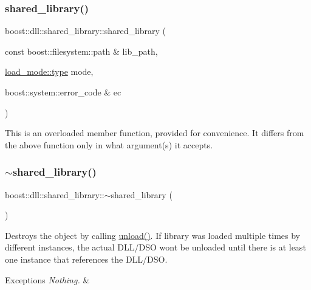\subsubsection{\texorpdfstring{shared\+\_\+library()}{shared\_library()}\hspace{0.1cm}{\footnotesize\ttfamily [7/7]}}
{\footnotesize\ttfamily boost\+::dll\+::shared\+\_\+library\+::shared\+\_\+library (\begin{DoxyParamCaption}\item[{const boost\+::filesystem\+::path \&}]{lib\+\_\+path,  }\item[{\hyperlink{a00272_a1918a602801479bc0bade54ff5665129}{load\+\_\+mode\+::type}}]{mode,  }\item[{boost\+::system\+::error\+\_\+code \&}]{ec }\end{DoxyParamCaption})\hspace{0.3cm}{\ttfamily [inline]}}

This is an overloaded member function, provided for convenience. It differs from the above function only in what argument(s) it accepts. \mbox{\label{a01708_aa8df68945bd8598c3b873f622d6d2baa}} 
\subsubsection{\texorpdfstring{$\sim$shared\+\_\+library()}{~shared\_library()}}
{\footnotesize\ttfamily boost\+::dll\+::shared\+\_\+library\+::$\sim$shared\+\_\+library (\begin{DoxyParamCaption}{ }\end{DoxyParamCaption})\hspace{0.3cm}{\ttfamily [inline]}}

Destroys the object by calling {\ttfamily \hyperlink{a01708_a0c01ab046e5dcabe4c10db2a28cbe33e}{unload()}}. If library was loaded multiple times by different instances, the actual D\+L\+L/\+D\+SO won\textquotesingle{}t be unloaded until there is at least one instance that references the D\+L\+L/\+D\+SO.


\begin{DoxyExceptions}{Exceptions}
{\em Nothing.} & \\
\hline
\end{DoxyExceptions}


